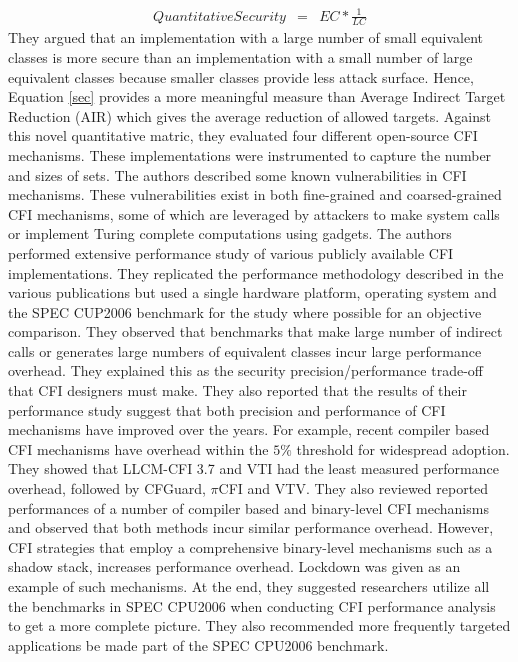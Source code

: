 \documentclass[dvips,12pt]{article}
\begin{document}
\begin{eqnarray}
QuantitativeSecurity &=& EC * \frac{1}{LC}
\label{sec}
\end{eqnarray}
\nolinebreak
They argued that an implementation with a large number of small equivalent classes is more secure than an implementation with a small number of large equivalent classes because smaller classes provide less attack surface. Hence, Equation \ref{sec} provides a more meaningful measure than Average Indirect Target Reduction (AIR) which gives the average reduction of allowed targets. Against this novel quantitative matric, they evaluated four different open-source CFI mechanisms. These implementations were instrumented to capture the number and sizes of sets. The authors described some known vulnerabilities in CFI mechanisms. These vulnerabilities exist in both fine-grained and coarsed-grained CFI mechanisms, some of which are leveraged by attackers to make system calls or implement Turing complete computations using gadgets.
\newline
\newline
The authors performed extensive performance study of various publicly available CFI implementations. They replicated the performance methodology described in the various publications but used a single hardware platform, operating system and the SPEC CUP2006 benchmark for the study where possible for an objective comparison. They observed that benchmarks that make large number of indirect calls or generates large numbers of equivalent classes incur large performance overhead. They explained this as the security precision/performance trade-off that CFI designers must make. They also reported that the results of their performance study suggest that both precision and performance of CFI mechanisms have improved over the years. For example, recent compiler based CFI mechanisms have overhead within the $5\%$ threshold for widespread adoption. They showed that LLCM-CFI 3.7 and VTI had the least measured performance overhead, followed by CFGuard, $\pi$CFI and VTV. They also reviewed reported performances of a number of compiler based and binary-level CFI mechanisms and observed that both methods incur similar performance overhead. However, CFI strategies that employ a comprehensive binary-level mechanisms such as a shadow stack, increases performance overhead. Lockdown was given as an example of such mechanisms. At the end, they suggested researchers utilize all the benchmarks in SPEC CPU2006 when conducting CFI performance analysis to get a more complete picture. They also recommended more frequently targeted applications be made part of the SPEC CPU2006 benchmark.  
\end{document}
